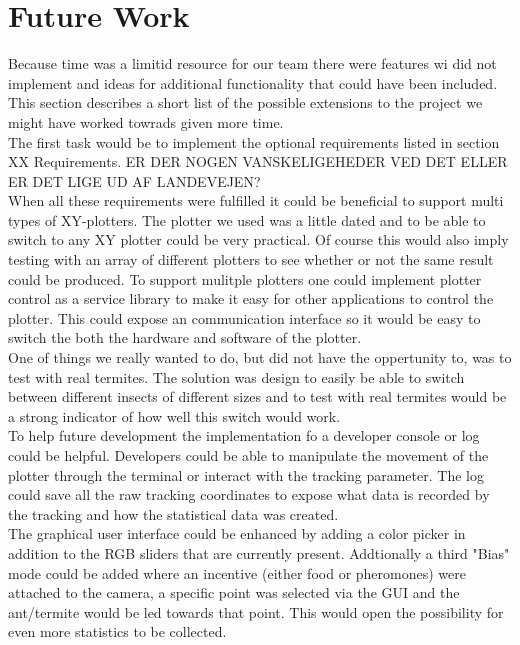 
\section{Future Work}

Because time was a limitid resource for our team there were features wi did not implement and ideas for additional functionality that could have been included. This section describes a short list of the possible extensions to the project we might have worked towrads given more time. \\

The first task would be to implement the optional requirements listed in section XX Requirements. ER DER NOGEN VANSKELIGEHEDER VED DET ELLER ER DET LIGE UD AF LANDEVEJEN? \\

When all these requirements were fulfilled it could be beneficial to support multi types of XY-plotters. The plotter we used was a little dated and to be able to switch to any XY plotter could be very practical. Of course this would also imply testing with an array of different plotters to see whether or not the same result could be produced. To support mulitple plotters one could implement plotter control as a service library to make it easy for other applications to control the plotter. This could expose an communication interface so it would be easy to switch the both the hardware and software of the plotter. \\

One of things we really wanted to do, but did not have the oppertunity to, was to test with real termites. The solution was design to easily be able to switch between different insects of different sizes and to test with real termites would be a strong indicator of how well this switch would work. \\

To help future development the implementation fo a developer console or log could be helpful. Developers could be able to manipulate the movement of the plotter through the terminal or interact with the tracking parameter. The log could save all the raw tracking coordinates to expose what data is recorded by the tracking and how the statistical data was created. \\

The graphical user interface could be enhanced by adding a color picker in addition to the RGB sliders that are currently present. Addtionally a third "Bias" mode could be added where an incentive (either food or pheromones) were attached to the camera, a specific point was selected via the GUI and the ant/termite would be led towards that point. This would open the possibility for even more statistics to be collected.